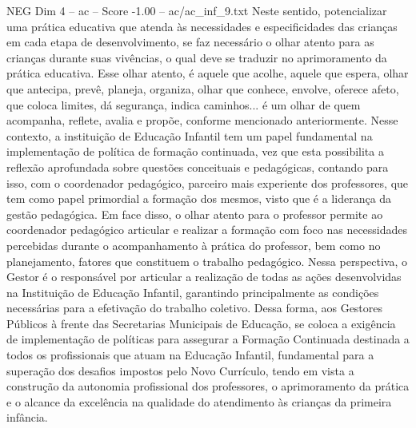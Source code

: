 \begin{textsample}{NEG Dim 4 – ac – Score -1.00 – ac/ac\_inf\_9.txt}
Neste sentido, potencializar uma prática educativa que atenda às necessidades e especificidades das crianças em cada etapa de desenvolvimento, se faz necessário o olhar atento para as crianças durante suas vivências, o qual deve se traduzir no aprimoramento da prática educativa.
Esse olhar atento, é aquele que acolhe, aquele que espera, olhar que antecipa, prevê, planeja, organiza, olhar que conhece, envolve, oferece afeto, que coloca limites, dá segurança, indica caminhos... é um olhar de quem acompanha, reflete, avalia e propõe, conforme mencionado anteriormente.
Nesse contexto, a instituição de Educação Infantil tem um papel fundamental na implementação de política de formação continuada, vez que esta possibilita a reflexão aprofundada sobre questões conceituais e pedagógicas, contando para isso, com o coordenador pedagógico, parceiro mais experiente dos professores, que tem como papel primordial a formação dos mesmos, visto que é a liderança da gestão pedagógica.
Em face disso, o olhar atento para o professor permite ao coordenador pedagógico articular e realizar a formação com foco nas necessidades percebidas durante o acompanhamento à prática do professor, bem como no planejamento, fatores que constituem o trabalho pedagógico.
Nessa perspectiva, o Gestor é o responsável por articular a realização de todas as ações desenvolvidas na Instituição de Educação Infantil, garantindo principalmente as condições necessárias para a efetivação do trabalho coletivo.
Dessa forma, aos Gestores Públicos à frente das Secretarias Municipais de Educação, se coloca a exigência de implementação de políticas para assegurar a Formação Continuada destinada a todos os profissionais que atuam na Educação Infantil, fundamental para a superação dos desafios impostos pelo Novo Currículo, tendo em vista a construção da autonomia profissional dos professores, o aprimoramento da prática e o alcance da excelência na qualidade do atendimento às crianças da primeira infância.

\end{textsample}
